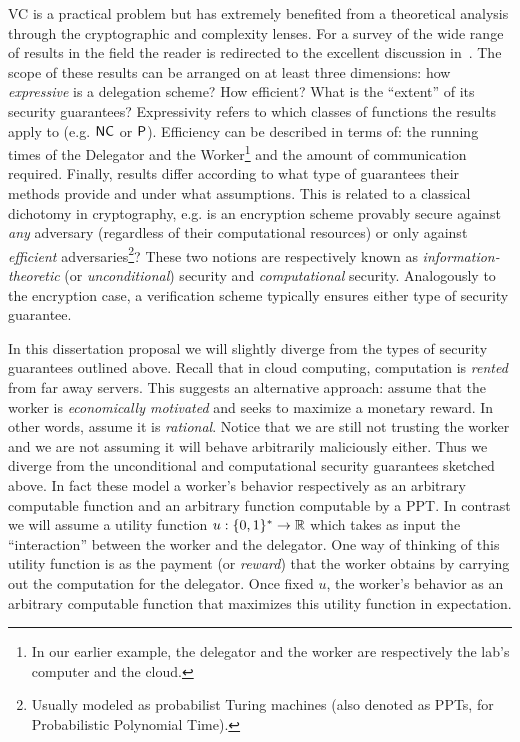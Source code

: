 VC is a practical problem but has extremely benefited from a theoretical analysis through the cryptographic and complexity lenses. For a survey of the wide range of results in the field the reader is redirected to the excellent discussion in~\cite{wb15}. %
 The scope of these results can be arranged on at least three dimensions: how \textit{expressive} is a delegation scheme? How   efficient? What is the ``extent'' of its security guarantees?
 Expressivity refers to which classes of functions the results apply to (e.g. $\NC$ or $\P$).
 Efficiency can be described in terms of: the running times of the Delegator and the Worker\footnote{In our earlier example, the delegator and the worker are respectively the lab's computer and the cloud.} and the amount of communication required. Finally, results differ according to what type of guarantees their methods provide and under what assumptions. This is related to a classical dichotomy in cryptography, e.g. is an encryption scheme provably secure against \textit{any} adversary (regardless of their computational resources) or only against \textit{efficient} adversaries\footnote{Usually modeled as probabilist Turing machines (also denoted as PPTs, for Probabilistic Polynomial Time).}? These two notions are respectively known as \textit{information-theoretic} (or \textit{unconditional}) security and \textit{computational} security. Analogously to the encryption case, a verification scheme typically ensures either type of security guarantee. 

In this dissertation proposal we will slightly diverge from the types of security guarantees outlined above. Recall that in cloud computing, computation is \textit{rented} from far away servers. This suggests an alternative approach: assume that the worker is \textit{economically motivated} and seeks to maximize a monetary reward. In other words, assume it is \textit{rational}. Notice that we are still not trusting the worker and we are not assuming it will behave arbitrarily maliciously either. Thus we diverge from the unconditional and computational security guarantees sketched above. In fact these model a worker's behavior respectively as an arbitrary computable function and an arbitrary function computable by a PPT. In contrast we will assume a utility function $u: \bits \to \reals$ which takes as input the ``interaction'' between the worker and the delegator. One way of thinking of this utility function is as the payment (or \textit{reward}) that the worker obtains by carrying out the computation for the delegator. Once fixed $u$, the worker's behavior as an arbitrary computable function that maximizes this utility function in expectation.


